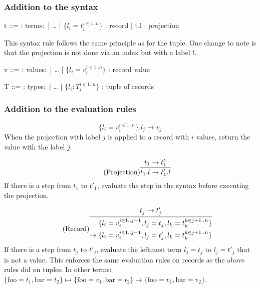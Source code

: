 \subsubsection{Addition to the syntax \cite{pierce2002ProgLang}}
\begin{bnfgrammar}
    t ::= : terms$\colon$
    | \dots
    | $\{l_i = t_i^{i \in 1..n}\}$ : record
    | t.l : projection
\end{bnfgrammar}\leavevmode\newline
This syntax rule follows the same principle as for the tuple. One change to
note is that the projection is not done via an index but with a label $l$.

\begin{bnfgrammar}
    v ::= : values$\colon$
    | \dots
    | $\{l_i = v_i^{i \in 1..n}\}$ : record value
\end{bnfgrammar}\leavevmode\newline

\begin{bnfgrammar}
    T ::= : types$\colon$
    | \dots
    | $\{l_i \colon T_i^{i \in 1..n}\}$ : tuple of records
\end{bnfgrammar}\leavevmode\newline

\subsubsection{Addition to the evaluation rules \cite{pierce2002ProgLang}}
\begin{equation*}
    \tag{Record projection}
    \{l_i = v_i^{i \in 1..n}\} . l_j \rightarrow v_j
\end{equation*}
When the projection with label $j$ is applied to a record with
$i$ values, return the value with the label $j$.

\begin{equation*}
    \tag{Projection}
    \infer{
        t_1 . l \rightarrow t'_1 . l
    }{
        t_1 \rightarrow t'_1
    }
\end{equation*}
If there is a step from $t_1$ to $t'_1$, evaluate the step
in the syntax before executing the projection.

\begin{equation*}
    \tag{Record}
    \infer{
        \begin{split}
            \{l_i = v_i^{i \in 1..j-1}, l_j = t_j, l_k = t_k^{k \in j+1..n}\} \\
            \rightarrow \{l_i = v_i^{i \in 1..j-1}, l_j = t'_j, l_k = t_k^{k \in j+1..n}\}
        \end{split}
    }{
        t_j \rightarrow t'_j
    }
\end{equation*}
If there is a step from $t_j$ to $t'_j$, evaluate the leftmost
term $l_j = t_j$ to $l_j = t'_j$ that is not a value. This enforces
the same evaluation rules on records as the above rules did on tuples.
In other terms:
$\{\text{foo}=t_1, \text{bar}=t_2\} \mapsto \{\text{foo}=v_1, \text{bar}=t_2\} \mapsto \{\text{foo}=v_1, \text{bar}=v_2\}$.

